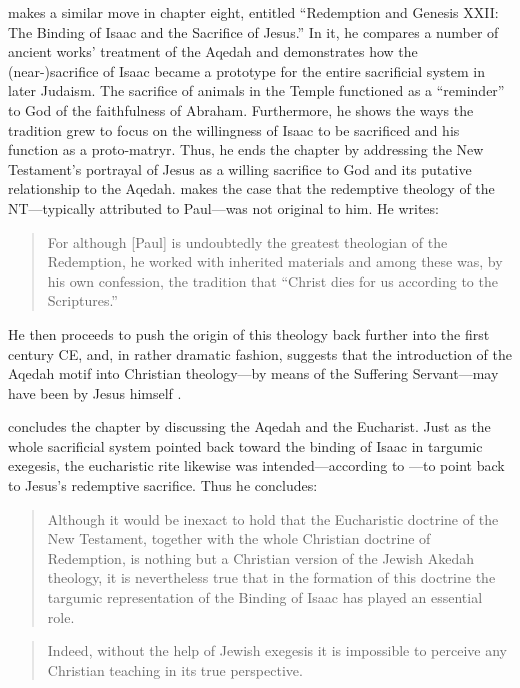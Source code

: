  \vermes makes a similar move in chapter eight, entitled ``Redemption and Genesis XXII: The Binding of Isaac and the Sacrifice of Jesus.'' In it, he compares a number of ancient works' treatment of the Aqedah and demonstrates how the (near-)sacrifice of Isaac became a prototype for the entire sacrificial system in later Judaism. The sacrifice of animals in the Temple functioned as a ``reminder'' to God of the faithfulness of Abraham. Furthermore, he shows the ways the tradition grew to focus on the willingness of Isaac to be sacrificed and his function as a proto-matryr. Thus, he ends the chapter by addressing the New Testament's portrayal of Jesus as a willing sacrifice to God and its putative relationship to the Aqedah. \vermes makes the case that the redemptive theology of the NT---typically attributed to Paul---was not original to him. He writes: 

 \begin{quote} For although {[}Paul{]} is undoubtedly the greatest theologian of the Redemption, he worked with inherited materials and among these was, by his own confession, the tradition that ``Christ dies for us according to the Scriptures.''\autocite[221]{vermes1961} \end{quote} 

 He then proceeds to push the origin of this theology back further into the first century CE, and, in rather dramatic fashion, suggests that the introduction of the Aqedah motif into Christian theology---by means of the Suffering Servant---may have been by Jesus himself \autocite[223]{vermes1961}. 

 \vermes concludes the chapter by discussing the Aqedah and the Eucharist. Just as the whole sacrificial system pointed back toward the binding of Isaac in targumic exegesis, the eucharistic rite likewise was intended---according to \vermes---to point back to Jesus's redemptive sacrifice. Thus he concludes: 

 \begin{quote} Although it would be inexact to hold that the Eucharistic doctrine of the New Testament, together with the whole Christian doctrine of Redemption, is nothing but a Christian version of the Jewish Akedah theology, it is nevertheless true that in the formation of this doctrine the targumic representation of the Binding of Isaac has played an essential role. \end{quote} 

 \begin{quote} Indeed, without the help of Jewish exegesis it is impossible to perceive any Christian teaching in its true perspective.\autocite[227]{vermes1961} \end{quote} 


